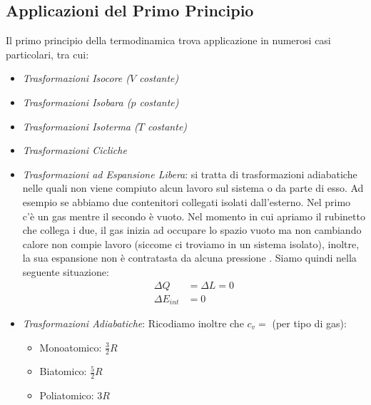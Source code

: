         \subsection{Applicazioni del Primo Principio} Il primo principio della 
        termodinamica trova applicazione in numerosi casi particolari, tra cui:
            \begin{itemize}
                \item \textit{Trasformazioni Isocore ($V$ costante)}
                \item \textit{Trasformazioni Isobara ($p$ costante)}

                \item \textit{Trasformazioni Isoterma ($T$ costante)}
                \item \textit{Trasformazioni Cicliche}
                \item \textit{Trasformazioni ad Espansione Libera}: si tratta 
                        di trasformazioni adiabatiche nelle quali non viene 
                        compiuto alcun lavoro sul sistema o da parte di esso.
                        Ad esempio se abbiamo due contenitori collegati isolati 
                        dall'esterno. Nel primo c'è un gas mentre il secondo è
                        vuoto. Nel momento in cui apriamo il rubinetto che 
                        collega i due, il gas inizia ad occupare lo spazio 
                        vuoto ma non cambiando calore non compie lavoro 
                        (siccome ci troviamo in un sistema isolato), inoltre,
                        la sua espansione non è contratasta da alcuna pressione
                        . Siamo quindi nella seguente situazione:
                        \begin{align*}
                            \Delta Q &= \Delta L = 0 \\
                            \Delta E_{int} &= 0
                        \end{align*}
                        
                \item \textit{Trasformazioni Adiabatiche}:
                        Ricodiamo inoltre che $c_v = $ (per tipo di gas):
                        \begin{itemize}
                            \item Monoatomico: $\frac{3}{2} R$
                            \item Biatomico: $\frac{5}{2} R$
                            \item Poliatomico: $3 R$
                        \end{itemize}
            \end{itemize}


